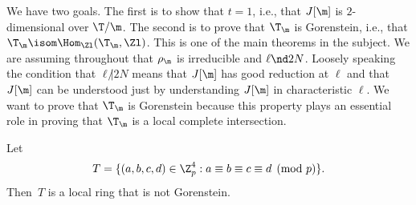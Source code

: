 \documentclass{report}
\begin{document}
We have two goals. The first is to show that $t=1$, i.e.,
that $J[\m]$ is $2$-dimensional over $\T/\m$. The second
is to prove that $\T_\m$ is Gorenstein, i.e., that
$\T_\m\isom\Hom_{\Zl}(\T_\m,\Zl)$. This is one of the main theorems
in the subject. We are assuming throughout that
$\rho_\m$ is irreducible and $\ell\nd 2N$. Loosely speaking
the condition that $\ell\not|2N$ means that $J[\m]$ has good
reduction at $\ell$ and that $J[\m]$ can be understood
just by understanding $J[\m]$ in characteristic $\ell$.
We want to prove that $\T_\m$ is Gorenstein because this property
plays an essential role in proving that $\T_\m$ is a local
complete intersection.
\begin{example}
Let
$$T=\{(a,b,c,d)\in\Z_p^4 : a\equiv b\equiv c\equiv d\pmod{p}\}.$$
Then~$T$ is a local ring that is not Gorenstein.
\end{example}
\end{document}
